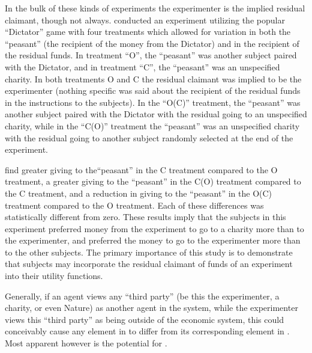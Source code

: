 In the bulk of these kinds of experiments the experimenter is the implied residual claimant, though not always.
\textcite{Harrison2006} conducted an experiment utilizing the popular \enquote{Dictator} game with four treatments which allowed for variation in both the \enquote{peasant} (the recipient of the money from the Dictator) and in the recipient of the residual funds.
In treatment \enquote{O}, the \enquote{peasant} was another subject paired with the Dictator, and in treatment \enquote{C}, the \enquote{peasant} was an unspecified charity.
In both treatments O and C the residual claimant was implied to be the experimenter (nothing specific was said about the recipient of the residual funds in the instructions to the subjects).
In the \enquote{O(C)} treatment, the \enquote{peasant} was another subject paired with the Dictator with the residual going to an unspecified charity, while in the \enquote{C(O)} treatment the \enquote{peasant} was an unspecified charity with the residual going to another subject randomly selected at the end of the experiment.

\textcite[196]{Harrison2006} find greater giving to the\enquote{peasant} in the C treatment compared to the O treatment, a greater giving to the \enquote{peasant} in the C(O) treatment compared to the C treatment, and a reduction in giving to the \enquote{peasant} in the O(C) treatment compared to the O treatment.
Each of these differences was statistically different from zero.
These results imply that the subjects in this experiment preferred money from the experiment to go to a charity more than to the experimenter, and preferred the money to go to the experimenter more than to the other subjects.
The primary importance of this study is to demonstrate that subjects may incorporate the residual claimant of funds of an experiment into their utility functions. 

Generally, if an agent views any \enquote{third party} (be this the experimenter, a charity, or even Nature) as another agent in the system, while the experimenter views this \enquote{third party} as being outside of the economic system, this could conceivably cause any element in  to differ from its corresponding element in .
Most apparent however is the potential for .

